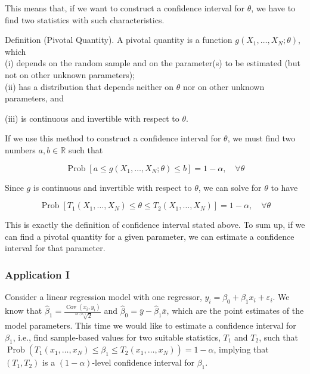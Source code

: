 This means that, if we want to construct a confidence interval for $\theta$, we have to find two statistics with such characteristics.

Definition (Pivotal Quantity). A pivotal quantity is a function $g\left(X_{1}, \ldots, X_{N} ; \theta\right)$, which\\
(i) depends on the random sample and on the parameter(s) to be estimated (but not on other unknown parameters);\\
(ii) has a distribution that depends neither on $\theta$ nor on other unknown parameters, and

(iii) is continuous and invertible with respect to $\theta$.

If we use this method to construct a confidence interval for $\theta$, we must find two numbers $a, b \in \mathbb{R}$ such that

$$
\operatorname{Prob}\left[a \leq g\left(X_{1}, \ldots, X_{N} ; \theta\right) \leq b\right]=1-\alpha, \quad \forall \theta
$$

Since $g$ is continuous and invertible with respect to $\theta$, we can solve for $\theta$ to have

$$
\operatorname{Prob}\left[T_{1}\left(X_{1}, \ldots, X_{N}\right) \leq \theta \leq T_{2}\left(X_{1}, \ldots, X_{N}\right)\right]=1-\alpha, \quad \forall \theta
$$

This is exactly the definition of confidence interval stated above. To sum up, if we can find a pivotal quantity for a given parameter, we can estimate a confidence interval for that parameter.

\subsubsection{Application I}
Consider a linear regression model with one regressor, $y_{i}=\beta_{0}+\beta_{1} x_{i}+\varepsilon_{i}$. We know that $\widehat{\beta}_{1}=\frac{\operatorname{Cov}\left(x_{i}, y_{i}\right)}{\sqrt[\operatorname{ar}\left(x_{i}\right)]{2}}$ and $\widehat{\beta}_{0}=\bar{y}-\widehat{\beta}_{1} \bar{x}$, which are the point estimates of the model parameters. This time we would like to estimate a confidence interval for $\beta_{1}$, i.e., find sample-based values for two suitable statistics, $T_{1}$ and $T_{2}$, such that $\operatorname{Prob}\left(T_{1}\left(x_{1}, \ldots, x_{N}\right) \leq \beta_{1} \leq T_{2}\left(x_{1}, \ldots, x_{N}\right)\right)=1-\alpha$, implying that $\left(T_{1}, T_{2}\right)$ is a $(1-\alpha)$-level confidence interval for $\beta_{1}$.

